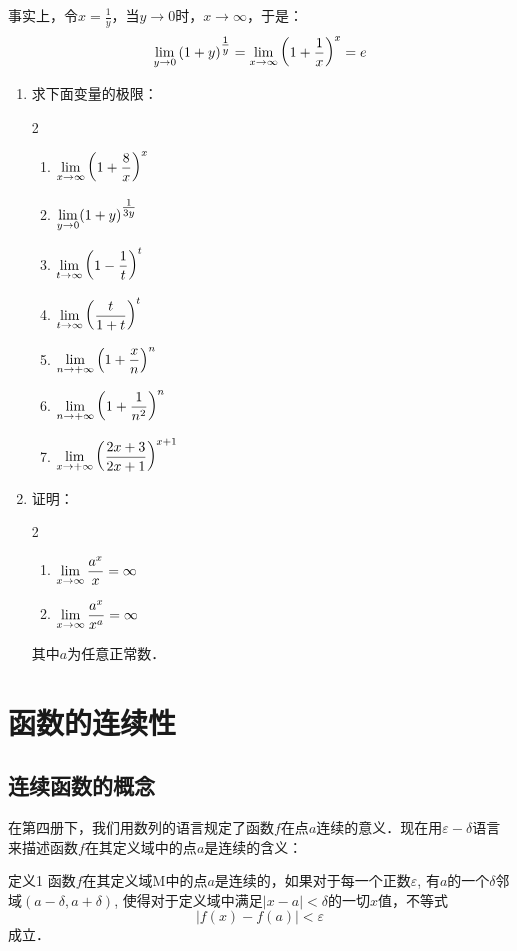 事实上，令$x=\frac{1}{y}$，当$y\to 0$时，$x\to\infty$，于是：
\[\displaystyle\lim_{y\to 0}\left(1+y\right)^{\tfrac{1}{y}}=\displaystyle\lim_{x\to \infty}\left(1+\dfrac{1}{x}\right)^{x}=e\]

\begin{ex}
\begin{enumerate}
    \item 求下面变量的极限：
\begin{multicols}{2}
\begin{enumerate}
    \item $\displaystyle\lim_{x\to\infty}\left(1+\dfrac{8}{x}\right)^x$
    \item $\displaystyle\lim_{y\to 0}(1+y)^{\tfrac{1}{3y}}$
    \item $\displaystyle\lim_{t\to\infty}\left(1-\dfrac{1}{t}\right)^t$
    \item $\displaystyle\lim_{t\to\infty}\left(\dfrac{t}{1+t}\right)^t$
    \item $\displaystyle\lim_{n\to+\infty}\left(1+\dfrac{x}{n}\right)^n$
    \item $\displaystyle\lim_{n\to +\infty}\left(1+\dfrac{1}{n^2}\right)^n$
    \item $\displaystyle\lim_{x\to+\infty}\left(\dfrac{2x+3}{2x+1}\right)^{x+1}$
\end{enumerate}
\end{multicols}

\item 证明：
\begin{multicols}{2}
\begin{enumerate}
    \item $\displaystyle\lim_{x\to\infty}\dfrac{a^x}{x}=\infty$
    \item $\displaystyle\lim_{x\to\infty}\dfrac{a^x}{x^a}=\infty$
\end{enumerate}
\end{multicols}
其中$a$为任意正常数．
\end{enumerate}
\end{ex}

\section{函数的连续性}
\subsection{连续函数的概念}

在第四册下，我们用数列的语言规定了函数$f$在点$a$连续的意义．现在用$\varepsilon-\delta$语言来描述函数$f$在其定义域中的点$a$是连续的含义：

\begin{blk}
   {定义1} 函数$f$在其定义域M中的点$a$是连续的，如果对于每一个正数$\varepsilon$, 有$a$的一个$\delta$邻域$(a-\delta,a+\delta)$, 使得对于定义域中满足$|x-a|<\delta$的一切$x$值，不等式
\[|f (x) -f(a)|<\varepsilon\]
成立． 
\end{blk}


